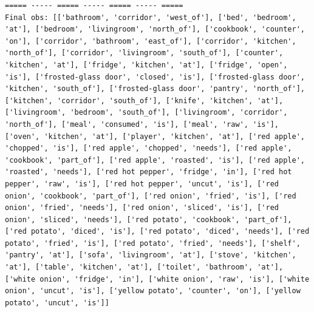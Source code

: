 \documentclass[11pt]{article}
\begin{document}
\begin{lstlisting}
===== ----- ===== ----- ===== ----- =====
Final obs: [['bathroom', 'corridor', 'west_of'], ['bed', 'bedroom', 'at'], ['bedroom', 'livingroom', 'north_of'], ['cookbook', 'counter', 'on'], ['corridor', 'bathroom', 'east_of'], ['corridor', 'kitchen', 'north_of'], ['corridor', 'livingroom', 'south_of'], ['counter', 'kitchen', 'at'], ['fridge', 'kitchen', 'at'], ['fridge', 'open', 'is'], ['frosted-glass door', 'closed', 'is'], ['frosted-glass door', 'kitchen', 'south_of'], ['frosted-glass door', 'pantry', 'north_of'], ['kitchen', 'corridor', 'south_of'], ['knife', 'kitchen', 'at'], ['livingroom', 'bedroom', 'south_of'], ['livingroom', 'corridor', 'north_of'], ['meal', 'consumed', 'is'], ['meal', 'raw', 'is'], ['oven', 'kitchen', 'at'], ['player', 'kitchen', 'at'], ['red apple', 'chopped', 'is'], ['red apple', 'chopped', 'needs'], ['red apple', 'cookbook', 'part_of'], ['red apple', 'roasted', 'is'], ['red apple', 'roasted', 'needs'], ['red hot pepper', 'fridge', 'in'], ['red hot pepper', 'raw', 'is'], ['red hot pepper', 'uncut', 'is'], ['red onion', 'cookbook', 'part_of'], ['red onion', 'fried', 'is'], ['red onion', 'fried', 'needs'], ['red onion', 'sliced', 'is'], ['red onion', 'sliced', 'needs'], ['red potato', 'cookbook', 'part_of'], ['red potato', 'diced', 'is'], ['red potato', 'diced', 'needs'], ['red potato', 'fried', 'is'], ['red potato', 'fried', 'needs'], ['shelf', 'pantry', 'at'], ['sofa', 'livingroom', 'at'], ['stove', 'kitchen', 'at'], ['table', 'kitchen', 'at'], ['toilet', 'bathroom', 'at'], ['white onion', 'fridge', 'in'], ['white onion', 'raw', 'is'], ['white onion', 'uncut', 'is'], ['yellow potato', 'counter', 'on'], ['yellow potato', 'uncut', 'is']]

\end{lstlisting}
\end{document}
